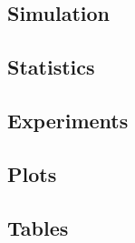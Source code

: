
\subsection{Simulation}
	
	

\subsection{Statistics}
	
	
	

\subsection{Experiments}
	
	

\subsection{Plots}
	
	
	
	
	

\subsection{Tables}
	
	
	
	
